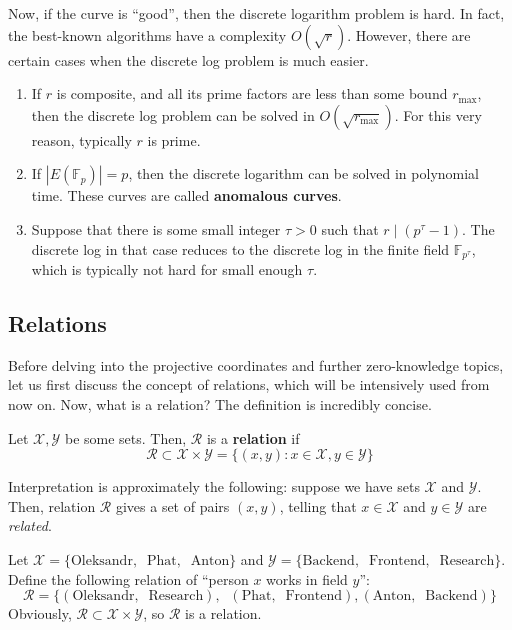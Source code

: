 \documentclass[../lecture-notes-148x210.tex]{subfiles}
\begin{document}
Now, if the curve is ``good'', then the discrete logarithm problem is hard. In fact, the best-known algorithms have a complexity $O(\sqrt{r})$. However, there are certain cases when the discrete log problem is much easier.
\begin{enumerate}
    \item If $r$ is composite, and all its prime factors are less than some bound $r_{\max}$, then the discrete log problem can be solved in $O(\sqrt{r_{\max}})$. For this very reason, typically $r$ is prime.
    \item If $|E(\mathbb{F}_p)|=p$, then the discrete logarithm can be solved in polynomial time. These curves are called \textbf{anomalous curves}.
    \item Suppose that there is some small integer $\tau>0$ such that $r \mid (p^{\tau}-1)$. The discrete log in that case reduces to the discrete log in the finite field $\mathbb{F}_{p^{\tau}}$, which is typically not hard for small enough $\tau$.
\end{enumerate}

\subsection{Relations}\label{section:relations}

Before delving into the projective coordinates and further zero-knowledge topics, let us first discuss the concept of relations, which will be intensively used from now on. Now, what is a relation? The definition is incredibly concise.

\begin{definition}
    Let $\mathcal{X},\mathcal{Y}$ be some sets. Then, $\mathcal{R}$ is a \textbf{relation} if 
    \begin{equation*}
        \mathcal{R} \subset \mathcal{X} \times \mathcal{Y} = \{(x,y): x \in \mathcal{X}, y \in \mathcal{Y}\}
    \end{equation*}
\end{definition}

Interpretation is approximately the following: suppose we have sets $\mathcal{X}$ and $\mathcal{Y}$. Then, relation $\mathcal{R}$ gives a set of pairs $(x,y)$, telling that $x \in \mathcal{X}$ and $y \in \mathcal{Y}$ are \textit{related}.

\begin{example}
    Let $\mathcal{X} = \{\text{Oleksandr}, \;\; \text{Phat}, \;\; \text{Anton}\}$ and $\mathcal{Y} = \{\text{Backend}, \;\; \text{Frontend}, \;\; \text{Research}\}$. Define the following relation of ``person $x$ works in field $y$'':
    \begin{equation*}
        \mathcal{R} = \{(\text{Oleksandr}, \;\; \text{Research}), \;\; (\text{Phat}, \;\; \text{Frontend}), (\text{Anton}, \;\; \text{Backend})\}
    \end{equation*}
    Obviously, $\mathcal{R} \subset \mathcal{X} \times \mathcal{Y}$, so $\mathcal{R}$ is a relation.
\end{example}
\end{document}
